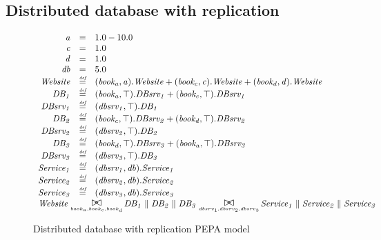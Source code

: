 %
%
\subsection{Distributed database with replication}

\begin{figure}
	\caption{Distributed database with replication PEPA model}
	\label{figure:pepa_ddwr_model}
	\centering
\begin{displaymath}
	\begin{array}{rcl}
		\mathit{a} & = & 1.0-10.0\\
		\mathit{c} & = & 1.0\\
		\mathit{d} & = & 1.0\\
		\mathit{db} & = & 5.0\\
		[0.0ex]		\mathit{Website} & \rmdef & (\mathit{book_a},\mathit{a}).\mathit{Website}+(\mathit{book_c},\mathit{c}).\mathit{Website}+(\mathit{book_d},\mathit{d}).\mathit{Website}\\
		\mathit{DB_1} & \rmdef & (\mathit{book_a},\top).\mathit{DBsrv_1}+(\mathit{book_c},\top).\mathit{DBsrv_1}\\
		\mathit{DBsrv_1} & \rmdef & (\mathit{dbsrv_1},\top).\mathit{DB_1}\\
		\mathit{DB_2} & \rmdef & (\mathit{book_c},\top).\mathit{DBsrv_2}+(\mathit{book_d},\top).\mathit{DBsrv_2}\\
		\mathit{DBsrv_2} & \rmdef & (\mathit{dbsrv_2},\top).\mathit{DB_2}\\
		\mathit{DB_3} & \rmdef & (\mathit{book_d},\top).\mathit{DBsrv_3}+(\mathit{book_a},\top).\mathit{DBsrv_3}\\
		\mathit{DBsrv_3} & \rmdef & (\mathit{dbsrv_3},\top).\mathit{DB_3}\\
		\mathit{Service_1} & \rmdef & (\mathit{dbsrv_1},\mathit{db}).\mathit{Service_1}\\
		\mathit{Service_2} & \rmdef & (\mathit{dbsrv_2},\mathit{db}).\mathit{Service_2}\\
		\mathit{Service_3} & \rmdef & (\mathit{dbsrv_3},\mathit{db}).\mathit{Service_3}\\
		[0.0ex]		\multicolumn{3}{l}{\mathit{Website}\sync{book_a,book_c,book_d}\mathit{DB_1}\parallel\mathit{DB_2}\parallel\mathit{DB_3}\sync{dbsrv_1,dbsrv_2,dbsrv_3}\mathit{Service_1}\parallel\mathit{Service_2}\parallel\mathit{Service_3}}\\
		[0.0ex]	\end{array}
\end{displaymath}
\end{figure}

